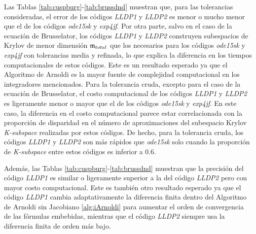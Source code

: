 Las Tablas \ref{tab:cuspburg}-\ref{tab:brussdnd} muestran que, para las tolerancias consideradas, el error de los códigos \emph{LLDP1} y \emph{LLDP2} es menor o mucho menor que el de los códigos \emph{ode15sk} y \emph{exp4jf}. Por otra parte, salvo en el caso de la ecuación de Brusselator, los códigos \emph{LLDP1} y \emph{LLDP2} construyen subespacios de Krylov de menor dimensión $\mathfrak{m}_{total}$ que los necesarios para los códigos \emph{ode15sk } y \emph{exp4jf} con tolerancias media y refinada, lo que explica la diferencia en los tiempos computacionales de estos códigos. Este es un resultado esperado ya que el Algoritmo de Arnoldi es la mayor fuente de complejidad computacional en los integradores mencionados. Para la tolerancia cruda, excepto para el caso de la ecuación de Brusselator, el costo computacional de los códigos \emph{LLDP1} y \emph{LLDP2} es ligeramente menor o mayor que el de los códigos \emph{ode15sk} y \emph{ exp4jf}. En este caso, la diferencia en el costo computacional parece estar correlacionada con la proporción de disparidad en el número de aproximaciones del subespacio Krylov \textit{K-subspace} realizadas por estos códigos. De hecho, para la tolerancia cruda, los códigos \emph{LLDP1} y \emph{LLDP2} son más rápidos que \emph{ode15sk} solo cuando la proporción de \textit{K-subspace} entre estos códigos es inferior a 0.6.

Además, las Tablas \ref{tab:cuspburg}-\ref{tab:brussdnd} muestran que la precisión del código \emph{LLDP1} es similar o ligeramente superior a la del código \emph{LLDP2} pero con mayor costo computacional. Este es también otro resultado esperado ya que el código \emph{LLDP1} cambia adaptativamente la diferencia finita dentro del Algoritmo de Arnoldi sin Jacobiano \ref{alg:iArnoldi} para aumentar el orden de convergencia de las fórmulas embebidas, mientras que el código \emph{ LLDP2} siempre usa la diferencia finita de orden más bajo.


